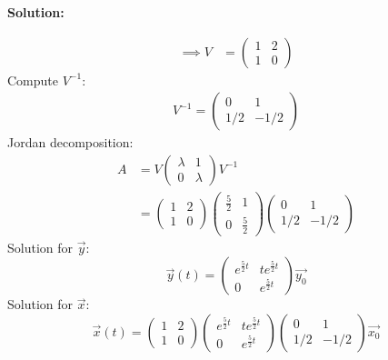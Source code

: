 \documentclass[12pt]{article}
\newenvironment{solution}{
    \textbf{Solution:}
    
}{
    
    \vspace{2em}
}
\begin{document}
\begin{solution}
\[\begin{aligned}
            \implies V &= \begin{pmatrix}
                1 & 2 \\
                1 & 0
            \end{pmatrix}
        \end{aligned}
    \]
    Compute \(V^{-1}\):
    \[
        \begin{aligned}
            V^{-1} = \begin{pmatrix}
                0 & 1 \\
                1/2 & -1/2
            \end{pmatrix}
        \end{aligned}
    \]
    Jordan decomposition:
    \[
        \begin{aligned}
            A &= V \begin{pmatrix}
                \lambda & 1 \\
                0 & \lambda
            \end{pmatrix} V^{-1}\\
            &= \begin{pmatrix}
                1 & 2 \\
                1 & 0
            \end{pmatrix} \begin{pmatrix}
                \frac{5}{2} & 1 \\
                0 & \frac{5}{2}
            \end{pmatrix} \begin{pmatrix}
                0 & 1 \\
                1/2 & -1/2
            \end{pmatrix}
        \end{aligned}
    \]
    Solution for \(\vec{y}\):
    \[
        \vec{y}(t) = \begin{pmatrix}
            e^{\frac{5}{2}t} & te^{\frac{5}{2}t} \\
            0 & e^{\frac{5}{2}t}
        \end{pmatrix} \vec{y_0}
    \]
    Solution for \(\vec{x}\):
    \[
        \vec{x}(t) = \begin{pmatrix}
            1 & 2 \\
            1 & 0
        \end{pmatrix} \begin{pmatrix}
            e^{\frac{5}{2}t} & te^{\frac{5}{2}t} \\
            0 & e^{\frac{5}{2}t}
        \end{pmatrix} \begin{pmatrix} 
            0 & 1 \\
            1/2 & -1/2
        \end{pmatrix} \vec{x_0}
    \]
    

\end{solution}
\end{document}
